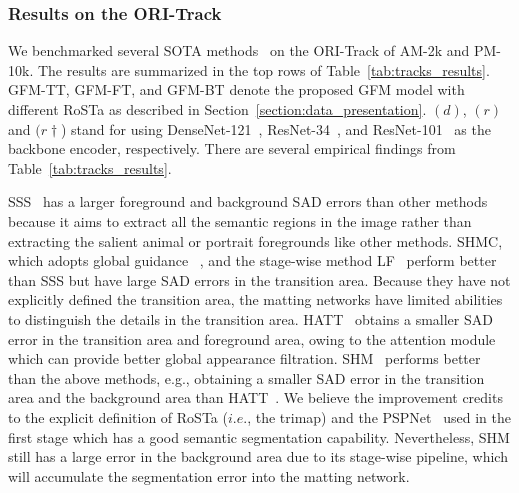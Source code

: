 \documentclass[twocolumn]{svjour3}
\begin{document}
\subsubsection{Results on the ORI-Track} We benchmarked several SOTA methods~\citep{chen2018semantic,zhang2019late,aksoy2018semantic,Qiao_2020_CVPR,liu2020boosting} on the ORI-Track of AM-2k and PM-10k. The results are summarized in the top rows of Table~\ref{tab:tracks_results}. GFM-TT, GFM-FT, and GFM-BT denote the proposed GFM model with different RoSTa as described in Section~\ref{section:data_presentation}. $(d)$, $(r)$ and $(r\dag$) stand for using DenseNet-121~\citep{huang2017densely}, ResNet-34~\citep{he2016deep}, and ResNet-101~\citep{he2016deep} as the backbone encoder, respectively. There are several empirical findings from Table~\ref{tab:tracks_results}.

SSS~\citep{aksoy2018semantic} has a larger foreground and background SAD errors than other methods because it aims to extract all the semantic regions in the image rather than extracting the salient animal or portrait foregrounds like other methods. SHMC, which adopts global guidance~\citep{liu2020boosting} , and the stage-wise method LF~\citep{zhang2019late} perform better than SSS but have large SAD errors in the transition area. Because they have not explicitly defined the transition area, the matting networks have limited abilities to distinguish the details in the transition area. HATT~\citep{Qiao_2020_CVPR} obtains a smaller SAD error in the transition area and foreground area, owing to the attention module which can provide better global appearance filtration. SHM~\citep{chen2018semantic} performs better than the above methods, e.g., obtaining a smaller SAD error in the transition area and the background area than HATT~\citep{Qiao_2020_CVPR}. We believe the improvement credits to the explicit definition of RoSTa ($i.e.$, the trimap) and the PSPNet~\citep{zhao2017pyramid} used in the first stage which has a good semantic segmentation capability. Nevertheless, SHM still has a large error in the background area due to its stage-wise pipeline, which will accumulate the segmentation error into the matting network. 
\end{document}
